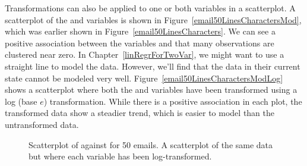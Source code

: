 \begin{doublespace}
Transformations can also be applied to one or both variables in a scatterplot. A scatterplot of the  and  variables is shown in Figure~\ref{email50LinesCharactersMod}, which was earlier shown in Figure~\ref{email50LinesCharacters}. We can see a positive association between the variables and that many observations are clustered near zero. In Chapter~\ref{linRegrForTwoVar}, we might want to use a straight line to model the data. However, we'll find that the data in their current state cannot be modeled very well. Figure~\ref{email50LinesCharactersModLog} shows a scatterplot where both the  and  variables have been transformed using a log (base $e$) transformation. While there is a positive association in each plot, the transformed data show a steadier trend, which is easier to model than the untransformed data.

\begin{figure}
\centering
{}
\caption{ Scatterplot of  against  for 50 emails.  A scatterplot of the same data but where each variable has been log-transformed.}
\label{email50LinesCharactersModMain}
\end{figure}


\end{doublespace}
